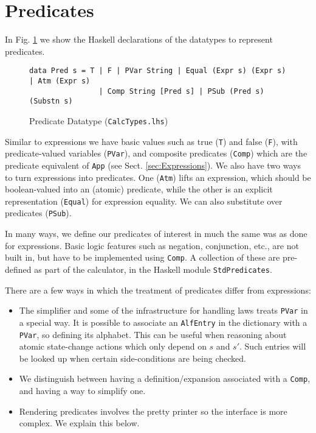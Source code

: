\section{Predicates}\label{sec:Predicates}

In Fig. \ref{fig:pred-types} we show the Haskell declarations
of the datatypes to represent predicates.
\begin{figure}[tb]
\begin{verbatim}
data Pred s = T | F | PVar String | Equal (Expr s) (Expr s) | Atm (Expr s)
                | Comp String [Pred s] | PSub (Pred s) (Substn s)
\end{verbatim}
  \caption{Predicate Datatype (\texttt{CalcTypes.lhs})}
  \label{fig:pred-types}
\end{figure}
Similar to expressions we have basic values such as true (\texttt{T})
and false (\texttt{F}),
 with predicate-valued variables (\texttt{PVar}),
and composite predicates (\texttt{Comp}) which are the predicate equivalent
of \texttt{App} (see Sect. \ref{sec:Expressions}).
We also have two ways to turn expressions into predicates.
One (\texttt{Atm}) lifts an expression, which should be boolean-valued
into an (atomic) predicate,
while the other is an explicit representation (\texttt{Equal})
for expression equality.
We can also substitute over predicates (\texttt{PSub}).

In many ways,
we define our predicates of interest
in much the same was as done for expressions.
Basic logic features such as negation, conjunction, etc.,
are not built in,
but have to be implemented using \texttt{Comp}.
A collection of these are pre-defined as part of the calculator,
in the Haskell module \texttt{StdPredicates}.

There are a few ways in which the treatment of predicates
differ from expressions:
\begin{itemize}
  \item
    The simplifier and some of the infrastructure for handling
    laws treats \texttt{PVar} in a special way.
    It is possible to associate an \texttt{AlfEntry} in the dictionary
    with a \texttt{PVar}, so defining its alphabet.
    This can be useful when reasoning about atomic state-change
    actions which only depend on $s$ and $s'$.
    Such entries will be looked up when certain
    side-conditions are being checked.
  \item
    We distinguish between having a definition/expansion
    associated with a \texttt{Comp},
    and having a way to simplify one.
  \item
    Rendering predicates involves the pretty printer
    so the interface is more complex.
    We explain this below.
\end{itemize}



